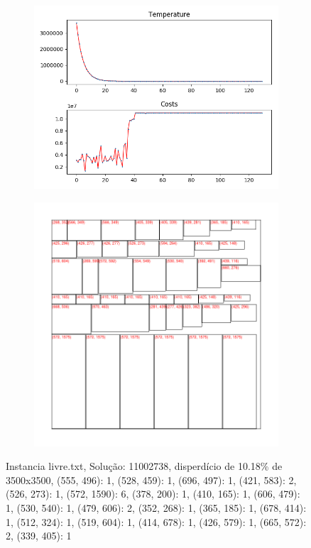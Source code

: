 \begin{figure}
\centering
\begin{subfigure}{.5\textwidth}
  \centering
  \includegraphics[width=1\linewidth]{results/livre/2/plot}
  \label{fig:sub1}
\end{subfigure}%
\begin{subfigure}{.5\textwidth}
  \centering
  \includegraphics[width=1\linewidth]{results/livre/2/cut}
  \label{fig:sub2}
\end{subfigure}
\caption{Instancia livre.txt, Solução: 11002738, disperdício de 10.18\% de 3500x3500, {(555, 496): 1, (528, 459): 1, (696, 497): 1, (421, 583): 2, (526, 273): 1, (572, 1590): 6, (378, 200): 1, (410, 165): 1, (606, 479): 1, (530, 540): 1, (479, 606): 2, (352, 268): 1, (365, 185): 1, (678, 414): 1, (512, 324): 1, (519, 604): 1, (414, 678): 1, (426, 579): 1, (665, 572): 2, (339, 405): 1}}
\label{fig:test}
\end{figure}

